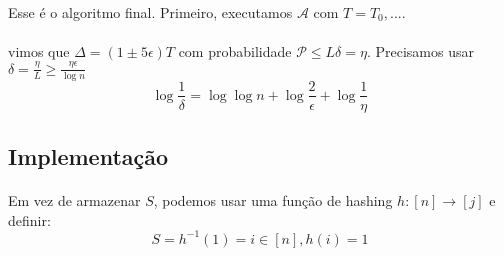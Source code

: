 \paragraph{} Esse é o algoritmo final. Primeiro, executamos $\mathcal{A}$ com $T=T_0,...$.
\paragraph{} vimos que $\Delta=(1 \pm 5\epsilon)T$ com probabilidade $\mathcal{P} \leq L\delta=\eta$. Precisamos usar $\delta=\frac{\eta}{L}\geq\frac{\eta \epsilon}{\log{n}}$
$$\log{\frac{1}{\delta}}=\log{\log{n}}+\log{\frac{2}{\epsilon}}+\log{\frac{1}{\eta}}$$

\subsection{Implementação}
\paragraph{}Em vez de armazenar $S$, podemos usar uma função de hashing $h:[n] \rightarrow [j]$ e definir:
$$S = h^{-1}(1) ={ i \in [n], h(i) = 1}$$


